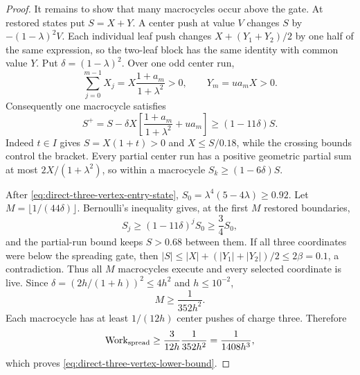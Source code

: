 \begin{proof}
It remains to show that many macrocycles occur above the gate.  At restored
states put $S=X+Y$.  A center push at value $V$ changes $S$ by
$-(1-\lambda)^2V$.  Each individual leaf push changes
$X+(Y_1+Y_2)/2$ by one half of the same expression, so the two-leaf block
has the same identity with common value $Y$.  Put
$\delta=(1-\lambda)^2$.  Over one odd center run,
\begin{equation*}
 \sum_{j=0}^{m-1}X_j=X\frac{1+a_m}{1+\lambda^2}>0,
 \qquad Y_m=u a_mX>0.
\end{equation*}
Consequently one macrocycle satisfies
\begin{equation}
 S^+=S-\delta X\left[
  \frac{1+a_m}{1+\lambda^2}+u a_m
 \right]
 \geq(1-11\delta)S.
 \label{eq:direct-three-vertex-slow-sum}
\end{equation}
Indeed $t\in I$ gives $S=X(1+t)>0$ and $X\leq S/0.18$, while the crossing
bounds control the bracket.  Every partial center run has a positive
geometric partial sum at most $2X/(1+\lambda^2)$, so within a macrocycle
$S_k\geq(1-6\delta)S$.

After \cref{eq:direct-three-vertex-entry-state},
$S_0=\lambda^4(5-4\lambda)\geq0.92$.  Let
$M=\lfloor1/(44\delta)\rfloor$.  Bernoulli's inequality gives, at the first
$M$ restored boundaries,
\begin{equation*}
 S_j\geq(1-11\delta)^jS_0\geq\frac34S_0,
\end{equation*}
and the partial-run bound keeps $S>0.68$ between them.  If all three
coordinates were below the spreading gate, then
$|S|\leq|X|+(|Y_1|+|Y_2|)/2\leq2\beta=0.1$, a contradiction.  Thus all $M$
macrocycles execute and every selected coordinate is live.  Since
$\delta=(2h/(1+h))^2\leq4h^2$ and $h\leq10^{-2}$,
\begin{equation*}
 M\geq\frac1{352h^2}.
\end{equation*}
Each macrocycle has at least $1/(12h)$ center pushes of charge three.
Therefore
\begin{equation*}
 \operatorname{Work}_{\rm spread}
 \geq\frac{3}{12h}\frac1{352h^2}
 =\frac1{1408h^3},
\end{equation*}
which proves \cref{eq:direct-three-vertex-lower-bound}.
\end{proof}

